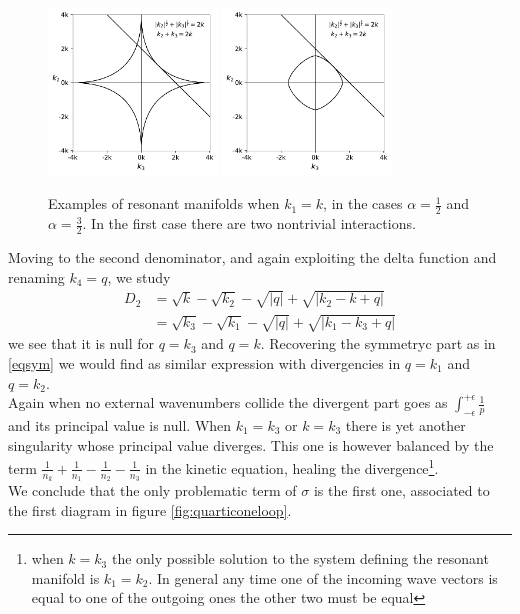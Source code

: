     \begin{figure}[ht]
        \centering
        \includegraphics[width=0.4\textwidth]{images/nonlocal_resonances_convex.pdf}
        \includegraphics[width=0.4\textwidth]{images/nonlocal_resonances_concave.pdf}
        \caption{Examples of resonant manifolds when $k_1 = k$, in the cases $\alpha = \frac{1}{2}$ and $\alpha = \frac{3}{2}$. In the first case there are two nontrivial interactions.}
        \label{fig:nonlocal}
    \end{figure}
    Moving to the second denominator, and again exploiting the delta function and renaming $k_4 = q$, we study
    \begin{equation}
        \begin{aligned}
      D_2 &= \sqrt{k} - \sqrt{k_2} - \sqrt{|q|} + \sqrt{|k_2-k + q|} \\
      &= \sqrt{k_3} - \sqrt{k_1} - \sqrt{|q|} + \sqrt{|k_1-k_3 + q|}
        \end{aligned}
    \end{equation}
    we see that it is null for $q = k_3$ and $q = k$. Recovering the symmetryc part as in \eqref{eqsym} we would find as similar expression with divergencies in $q = k_1$ and $q = k_2$. \\
    Again when no external wavenumbers collide the divergent part goes as $\int_{-\epsilon}^{+\epsilon}\frac{1}{p}$ and its principal value is null. When $k_1 = k_3$ or $k = k_3$ there is yet another singularity whose principal value diverges. This one is however balanced by the term $\frac{1}{n_k} + \frac{1}{n_1} -\frac{1}{n_2} -\frac{1}{n_3}$ in the kinetic equation, healing the divergence\footnote{
    when $k = k_3$ the only possible solution to the system defining the resonant manifold is $k_1 = k_2$.
    In general any time one of the incoming wave vectors is equal to one of the outgoing ones the other two must be equal}.\\
    We conclude that the only problematic term of $\sigma$ is the first one, associated to the first diagram in figure \ref{fig:quarticoneloop}. \\
    
